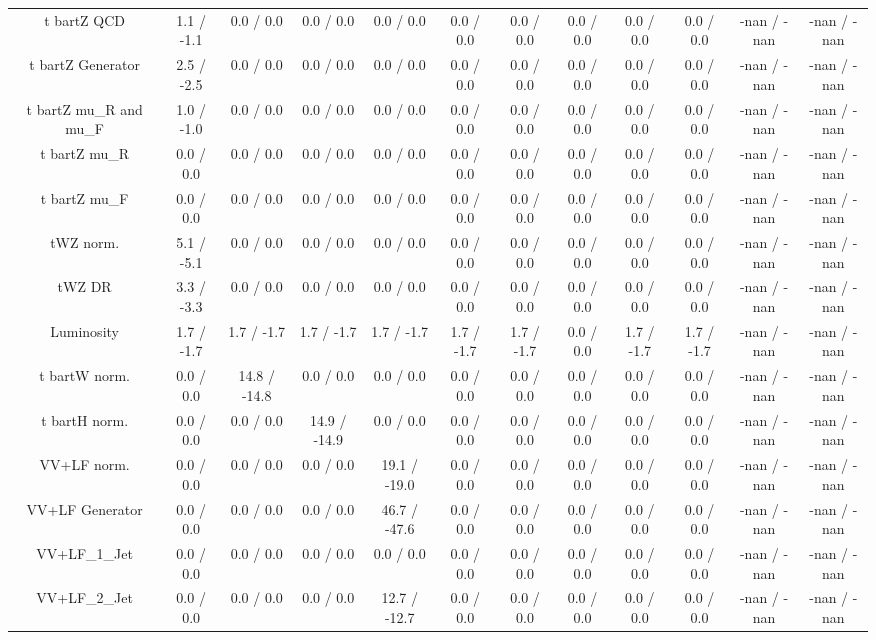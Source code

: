 \begin{table}[htbp]
\begin{center}
\begin{tabular}{|c|c|c|c|c|c|c|c|c|c|c|c|}
  t bar{t}Z QCD & 1.1 / -1.1 & 0.0 / 0.0 & 0.0 / 0.0 & 0.0 / 0.0 & 0.0 / 0.0 & 0.0 / 0.0 & 0.0 / 0.0 & 0.0 / 0.0 & 0.0 / 0.0 & -nan / -nan & -nan / -nan \\ 
  t bar{t}Z Generator & 2.5 / -2.5 & 0.0 / 0.0 & 0.0 / 0.0 & 0.0 / 0.0 & 0.0 / 0.0 & 0.0 / 0.0 & 0.0 / 0.0 & 0.0 / 0.0 & 0.0 / 0.0 & -nan / -nan & -nan / -nan \\ 
  t bar{t}Z  mu_{R} and  mu_{F} & 1.0 / -1.0 & 0.0 / 0.0 & 0.0 / 0.0 & 0.0 / 0.0 & 0.0 / 0.0 & 0.0 / 0.0 & 0.0 / 0.0 & 0.0 / 0.0 & 0.0 / 0.0 & -nan / -nan & -nan / -nan \\ 
  t bar{t}Z  mu_{R} & 0.0 / 0.0 & 0.0 / 0.0 & 0.0 / 0.0 & 0.0 / 0.0 & 0.0 / 0.0 & 0.0 / 0.0 & 0.0 / 0.0 & 0.0 / 0.0 & 0.0 / 0.0 & -nan / -nan & -nan / -nan \\ 
  t bar{t}Z  mu_{F} & 0.0 / 0.0 & 0.0 / 0.0 & 0.0 / 0.0 & 0.0 / 0.0 & 0.0 / 0.0 & 0.0 / 0.0 & 0.0 / 0.0 & 0.0 / 0.0 & 0.0 / 0.0 & -nan / -nan & -nan / -nan \\ 
  tWZ norm. & 5.1 / -5.1 & 0.0 / 0.0 & 0.0 / 0.0 & 0.0 / 0.0 & 0.0 / 0.0 & 0.0 / 0.0 & 0.0 / 0.0 & 0.0 / 0.0 & 0.0 / 0.0 & -nan / -nan & -nan / -nan \\ 
  tWZ DR & 3.3 / -3.3 & 0.0 / 0.0 & 0.0 / 0.0 & 0.0 / 0.0 & 0.0 / 0.0 & 0.0 / 0.0 & 0.0 / 0.0 & 0.0 / 0.0 & 0.0 / 0.0 & -nan / -nan & -nan / -nan \\ 
  Luminosity & 1.7 / -1.7 & 1.7 / -1.7 & 1.7 / -1.7 & 1.7 / -1.7 & 1.7 / -1.7 & 1.7 / -1.7 & 0.0 / 0.0 & 1.7 / -1.7 & 1.7 / -1.7 & -nan / -nan & -nan / -nan \\ 
  t bar{t}W norm. & 0.0 / 0.0 & 14.8 / -14.8 & 0.0 / 0.0 & 0.0 / 0.0 & 0.0 / 0.0 & 0.0 / 0.0 & 0.0 / 0.0 & 0.0 / 0.0 & 0.0 / 0.0 & -nan / -nan & -nan / -nan \\ 
  t bar{t}H norm. & 0.0 / 0.0 & 0.0 / 0.0 & 14.9 / -14.9 & 0.0 / 0.0 & 0.0 / 0.0 & 0.0 / 0.0 & 0.0 / 0.0 & 0.0 / 0.0 & 0.0 / 0.0 & -nan / -nan & -nan / -nan \\ 
  VV+LF norm. & 0.0 / 0.0 & 0.0 / 0.0 & 0.0 / 0.0 & 19.1 / -19.0 & 0.0 / 0.0 & 0.0 / 0.0 & 0.0 / 0.0 & 0.0 / 0.0 & 0.0 / 0.0 & -nan / -nan & -nan / -nan \\ 
  VV+LF Generator & 0.0 / 0.0 & 0.0 / 0.0 & 0.0 / 0.0 & 46.7 / -47.6 & 0.0 / 0.0 & 0.0 / 0.0 & 0.0 / 0.0 & 0.0 / 0.0 & 0.0 / 0.0 & -nan / -nan & -nan / -nan \\ 
  VV+LF_1_Jet & 0.0 / 0.0 & 0.0 / 0.0 & 0.0 / 0.0 & 0.0 / 0.0 & 0.0 / 0.0 & 0.0 / 0.0 & 0.0 / 0.0 & 0.0 / 0.0 & 0.0 / 0.0 & -nan / -nan & -nan / -nan \\ 
  VV+LF_2_Jet & 0.0 / 0.0 & 0.0 / 0.0 & 0.0 / 0.0 & 12.7 / -12.7 & 0.0 / 0.0 & 0.0 / 0.0 & 0.0 / 0.0 & 0.0 / 0.0 & 0.0 / 0.0 & -nan / -nan & -nan / -nan \\ 

\end{tabular}
\end{center}
\end{table}

